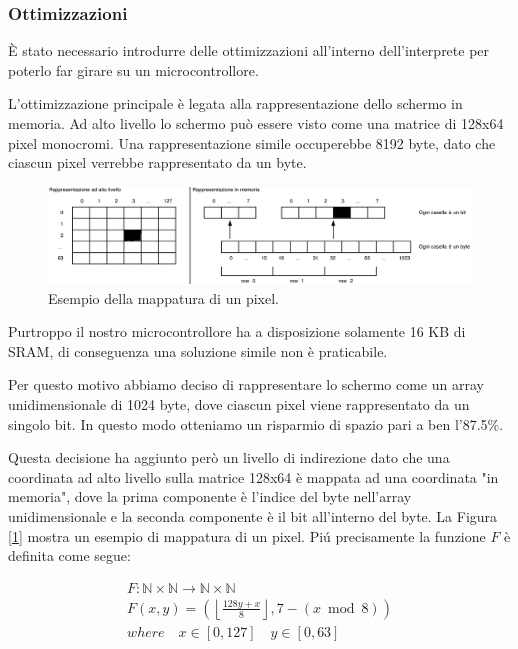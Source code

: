 \documentclass[a4paper]{article}
\begin{document}
\subsubsection{Ottimizzazioni}

È stato necessario introdurre delle ottimizzazioni all'interno
dell'interprete per poterlo far girare su un microcontrollore.

L'ottimizzazione principale è legata alla rappresentazione dello
schermo in memoria. Ad alto livello lo schermo può essere visto
come una matrice di 128x64 pixel monocromi. Una rappresentazione
simile occuperebbe 8192 byte, dato che ciascun pixel verrebbe
rappresentato da un byte.

\begin{figure}[h!t]
    \begin{center}
        \includegraphics[scale=0.38]{figures/screenopt_small.pdf}
    \end{center}
    \caption{Esempio della mappatura di un pixel.}
    \label{fig:screenopt}
\end{figure}

Purtroppo il nostro microcontrollore ha a disposizione solamente 16 KB di SRAM, di conseguenza
una soluzione simile non è praticabile.

Per questo motivo abbiamo deciso di rappresentare lo schermo come un array unidimensionale di
1024 byte, dove ciascun pixel viene rappresentato da un singolo bit. In questo modo otteniamo
un risparmio di spazio pari a ben l'87.5\%.

Questa decisione ha aggiunto però un livello di indirezione dato che una coordinata ad alto
livello sulla matrice 128x64 è mappata ad una coordinata "in memoria", dove la prima componente
è l'indice del byte nell'array unidimensionale e la seconda componente è il bit all'interno
del byte. La Figura [\ref{fig:screenopt}] mostra un esempio di mappatura di un pixel.
Piú precisamente la funzione $F$ è definita come segue:

\begin{gather*}
    F: \mathbb{N} \times \mathbb{N} \rightarrow \mathbb{N} \times \mathbb{N} \\
    F(x, y) = \left(\left\lfloor \frac{128y + x}{8} \right\rfloor, 7 - (x \bmod 8)\right) \\
    where \quad x \in [0, 127] \quad y \in [0, 63]
\end{gather*}
\end{document}
